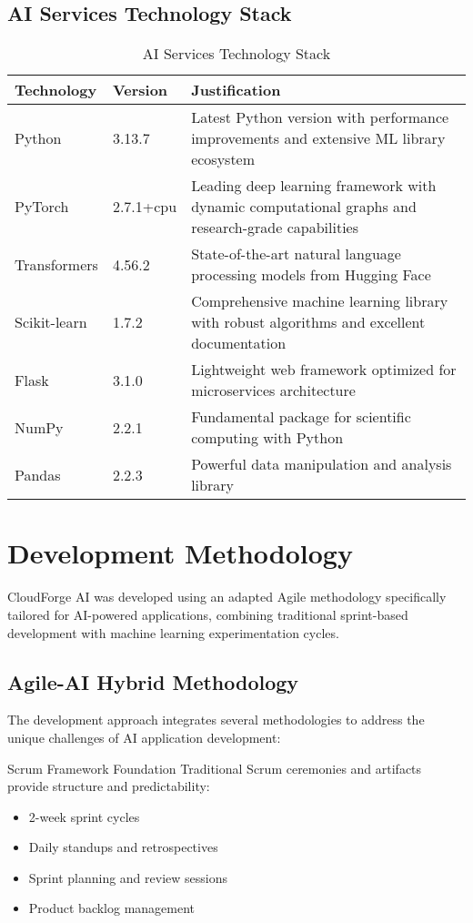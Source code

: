 \subsection{AI Services Technology Stack}

\begin{table}[H]
\centering
\caption{AI Services Technology Stack}
\begin{tabular}{|p{3cm}|p{4cm}|p{6cm}|}
\hline
\textbf{Technology} & \textbf{Version} & \textbf{Justification} \\
\hline
Python & 3.13.7 & Latest Python version with performance improvements and extensive ML library ecosystem \\
\hline
PyTorch & 2.7.1+cpu & Leading deep learning framework with dynamic computational graphs and research-grade capabilities \\
\hline
Transformers & 4.56.2 & State-of-the-art natural language processing models from Hugging Face \\
\hline
Scikit-learn & 1.7.2 & Comprehensive machine learning library with robust algorithms and excellent documentation \\
\hline
Flask & 3.1.0 & Lightweight web framework optimized for microservices architecture \\
\hline
NumPy & 2.2.1 & Fundamental package for scientific computing with Python \\
\hline
Pandas & 2.2.3 & Powerful data manipulation and analysis library \\
\hline
\end{tabular}
\end{table}

\section{Development Methodology}

CloudForge AI was developed using an adapted Agile methodology specifically tailored for AI-powered applications, combining traditional sprint-based development with machine learning experimentation cycles.

\subsection{Agile-AI Hybrid Methodology}

The development approach integrates several methodologies to address the unique challenges of AI application development:

\begin{sprintbox}{Scrum Framework Foundation}
Traditional Scrum ceremonies and artifacts provide structure and predictability:
\begin{itemize}
    \item 2-week sprint cycles
    \item Daily standups and retrospectives
    \item Sprint planning and review sessions
    \item Product backlog management
\end{itemize}
\end{sprintbox}

